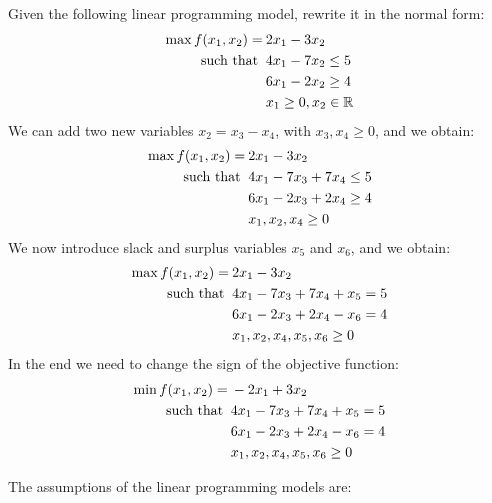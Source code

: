 \documentclass[12pt, a4paper]{report}
\begin{document}
    \begin{example}
        Given the following linear programming model, rewrite it in the normal form: 
        \begin{align*}
            \max{f(x_1,x_2)}           =&\: 2x_1-3x_2          \\
            \textnormal{such that }     &\: 4x_1-7x_2 \leq 5  \\
                                        &\: 6x_1-2x_2 \geq 4  \\
                                        &\: x_1 \geq 0, x_2 \in \mathbb{R}
        \end{align*}
        We can add two new variables $x_2=x_3-x_4$, with $x_3,x_4 \geq 0$, and we obtain:
        \begin{align*}
            \max{f(x_1,x_2)}           =&\: 2x_1-3x_2          \\
            \textnormal{such that }     &\: 4x_1-7x_3+7x_4 \leq 5  \\
                                        &\: 6x_1-2x_3+2x_4 \geq 4  \\
                                        &\: x_1,x_2,x_4 \geq 0
        \end{align*}
        We now introduce slack and surplus variables  $x_5$ and $x_6$, and we obtain: 
        \begin{align*}
            \max{f(x_1,x_2)}           =&\: 2x_1-3x_2          \\
            \textnormal{such that }     &\: 4x_1-7x_3+7x_4+x_5 = 5  \\
                                        &\: 6x_1-2x_3+2x_4-x_6 = 4  \\
                                        &\: x_1,x_2,x_4,x_5,x_6 \geq 0
        \end{align*}
        In the end we need to change the sign of the objective function: 
        \begin{align*}
            \min{f(x_1,x_2)}           =&\: -2x_1+3x_2          \\
            \textnormal{such that }     &\: 4x_1-7x_3+7x_4+x_5 = 5  \\
                                        &\: 6x_1-2x_3+2x_4-x_6 = 4  \\
                                        &\: x_1,x_2,x_4,x_5,x_6 \geq 0
        \end{align*}
    \end{example}
    The assumptions of the linear programming models are: 
\end{document}
